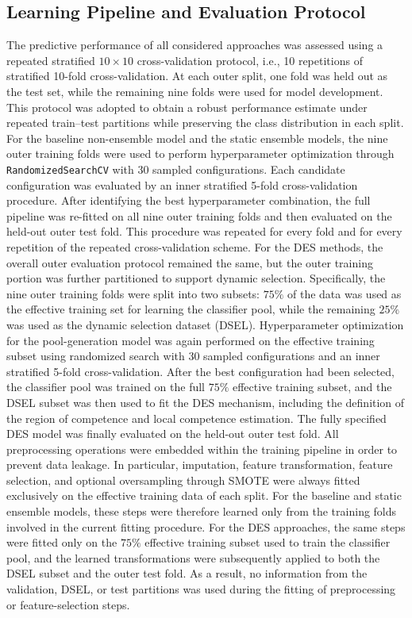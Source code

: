 \documentclass[conference]{IEEEtran}
\begin{document}
\subsection{Learning Pipeline and Evaluation Protocol}
The predictive performance of all considered approaches was assessed using a repeated stratified \(10 \times 10\) cross-validation protocol, i.e., 10 repetitions of stratified 10-fold cross-validation. At each outer split, one fold was held out as the test set, while the remaining nine folds were used for model development. This protocol was adopted to obtain a robust performance estimate under repeated train--test partitions while preserving the class distribution in each split. For the baseline non-ensemble model and the static ensemble models, the nine outer training folds were used to perform hyperparameter optimization through \texttt{RandomizedSearchCV} with 30 sampled configurations. Each candidate configuration was evaluated by an inner stratified 5-fold cross-validation procedure. After identifying the best hyperparameter combination, the full pipeline was re-fitted on all nine outer training folds and then evaluated on the held-out outer test fold. This procedure was repeated for every fold and for every repetition of the repeated cross-validation scheme. For the DES methods, the overall outer evaluation protocol remained the same, but the outer training portion was further partitioned to support dynamic selection. Specifically, the nine outer training folds were split into two subsets: \(75\%\) of the data was used as the effective training set for learning the classifier pool, while the remaining \(25\%\) was used as the dynamic selection dataset (DSEL). Hyperparameter optimization for the pool-generation model was again performed on the effective training subset using randomized search with 30 sampled configurations and an inner stratified 5-fold cross-validation. After the best configuration had been selected, the classifier pool was trained on the full \(75\%\) effective training subset, and the DSEL subset was then used to fit the DES mechanism, including the definition of the region of competence and local competence estimation. The fully specified DES model was finally evaluated on the held-out outer test fold. All preprocessing operations were embedded within the training pipeline in order to prevent data leakage. In particular, imputation, feature transformation, feature selection, and optional oversampling through SMOTE were always fitted exclusively on the effective training data of each split. For the baseline and static ensemble models, these steps were therefore learned only from the training folds involved in the current fitting procedure. For the DES approaches, the same steps were fitted only on the \(75\%\) effective training subset used to train the classifier pool, and the learned transformations were subsequently applied to both the DSEL subset and the outer test fold. As a result, no information from the validation, DSEL, or test partitions was used during the fitting of preprocessing or feature-selection steps.
\end{document}
